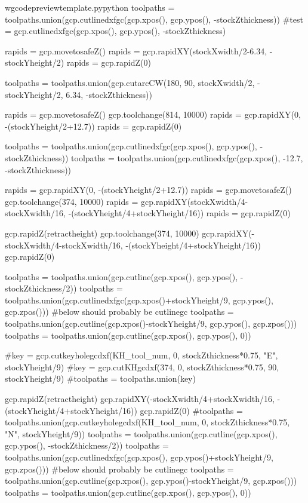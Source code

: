 \documentclass{ltxdoc}
\begin{document}
\begin{writecode}{w}{gcodepreviewtemplate.py}{python}
toolpaths = toolpaths.union(gcp.cutlinedxfgc(gcp.xpos(), gcp.ypos(), -stockZthickness))
#test = gcp.cutlinedxfgc(gcp.xpos(), gcp.ypos(), -stockZthickness)

rapids = gcp.movetosafeZ()
rapids = gcp.rapidXY(stockXwidth/2-6.34, -stockYheight/2)
rapids = gcp.rapidZ(0)

toolpaths = toolpaths.union(gcp.cutarcCW(180, 90, stockXwidth/2, -stockYheight/2, 6.34, -stockZthickness))

rapids = gcp.movetosafeZ()
gcp.toolchange(814, 10000)
rapids = gcp.rapidXY(0, -(stockYheight/2+12.7))
rapids = gcp.rapidZ(0)

toolpaths = toolpaths.union(gcp.cutlinedxfgc(gcp.xpos(), gcp.ypos(), -stockZthickness))
toolpaths = toolpaths.union(gcp.cutlinedxfgc(gcp.xpos(), -12.7, -stockZthickness))

rapids = gcp.rapidXY(0, -(stockYheight/2+12.7))
rapids = gcp.movetosafeZ()
gcp.toolchange(374, 10000)
rapids = gcp.rapidXY(stockXwidth/4-stockXwidth/16, -(stockYheight/4+stockYheight/16))
rapids = gcp.rapidZ(0)

gcp.rapidZ(retractheight)
gcp.toolchange(374, 10000)
gcp.rapidXY(-stockXwidth/4-stockXwidth/16, -(stockYheight/4+stockYheight/16))
gcp.rapidZ(0)

toolpaths = toolpaths.union(gcp.cutline(gcp.xpos(), gcp.ypos(), -stockZthickness/2))
toolpaths = toolpaths.union(gcp.cutlinedxfgc(gcp.xpos()+stockYheight/9, gcp.ypos(), gcp.zpos()))
#below should probably be cutlinegc
toolpaths = toolpaths.union(gcp.cutline(gcp.xpos()-stockYheight/9, gcp.ypos(), gcp.zpos()))
toolpaths = toolpaths.union(gcp.cutline(gcp.xpos(), gcp.ypos(), 0))

#key = gcp.cutkeyholegcdxf(KH_tool_num, 0, stockZthickness*0.75, "E", stockYheight/9)
#key = gcp.cutKHgcdxf(374, 0, stockZthickness*0.75, 90, stockYheight/9)
#toolpaths = toolpaths.union(key)

gcp.rapidZ(retractheight)
gcp.rapidXY(-stockXwidth/4+stockXwidth/16, -(stockYheight/4+stockYheight/16))
gcp.rapidZ(0)
#toolpaths = toolpaths.union(gcp.cutkeyholegcdxf(KH_tool_num, 0, stockZthickness*0.75, "N", stockYheight/9))
toolpaths = toolpaths.union(gcp.cutline(gcp.xpos(), gcp.ypos(), -stockZthickness/2))
toolpaths = toolpaths.union(gcp.cutlinedxfgc(gcp.xpos(), gcp.ypos()+stockYheight/9, gcp.zpos()))
#below should probably be cutlinegc
toolpaths = toolpaths.union(gcp.cutline(gcp.xpos(), gcp.ypos()-stockYheight/9, gcp.zpos()))
toolpaths = toolpaths.union(gcp.cutline(gcp.xpos(), gcp.ypos(), 0))


\end{writecode}
\end{document}
